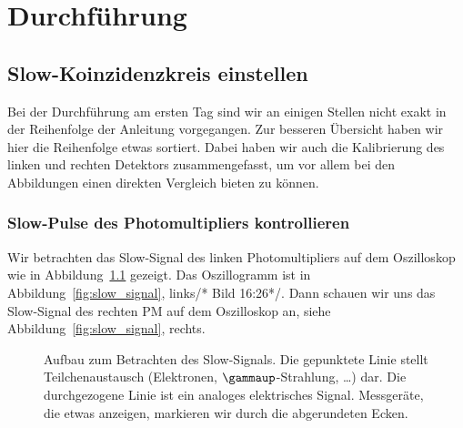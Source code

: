 
\chapter{Durchführung}

\section{Slow-Koinzidenzkreis einstellen}

Bei der Durchführung am ersten Tag sind wir an einigen Stellen nicht exakt in
der Reihenfolge der Anleitung vorgegangen. Zur besseren Übersicht haben wir
hier die Reihenfolge etwas sortiert. Dabei haben wir auch die Kalibrierung des
linken und rechten Detektors zusammengefasst, um vor allem bei den Abbildungen
einen direkten Vergleich bieten zu können.

\subsection{Slow-Pulse des Photomultipliers kontrollieren}

Wir betrachten das Slow-Signal des linken Photomultipliers auf dem Oszilloskop
wie in Abbildung~\ref{fig:aufbau:slow} gezeigt. Das Oszillogramm ist in
Abbildung~\ref{fig:slow_signal}, links/* Bild 16:26*/. Dann schauen wir uns das
Slow-Signal des rechten PM auf dem Oszilloskop an, siehe
Abbildung~\ref{fig:slow_signal}, rechts.

\begin{figure}[htbp]
    \centering
    \caption{%
        Aufbau zum Betrachten des Slow-Signals. Die gepunktete Linie stellt
        Teilchenaustausch (Elektronen, $\gammaup$-Strahlung, …) dar. Die
        durchgezogene Linie ist ein analoges elektrisches Signal. Messgeräte,
        die etwas anzeigen, markieren wir durch die abgerundeten Ecken.
    }
    \label{fig:aufbau:slow}
\end{figure}

